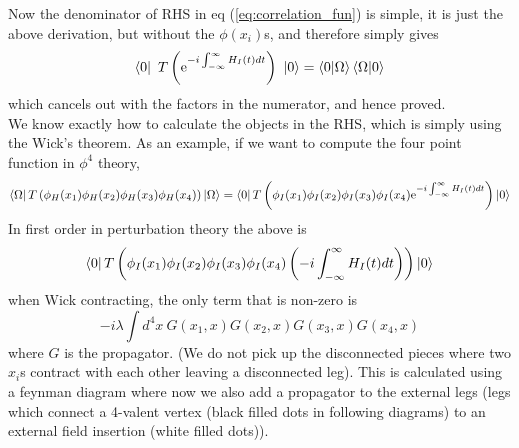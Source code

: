 \documentclass[11pt, notitlepage]{report}
\newcommand{\e}{\mathrm{e}}
\numberwithin{equation}{section}
\begin{document}
Now the denominator of RHS in eq (\ref{eq:correlation_fun}) is simple, it is just the above derivation, but without the \(\phi(x_i)\)s, and therefore simply gives 
\begin{equation*}
    \bra{0}~T\left( \e^{-i\int_{-\infty}^{\infty}H_I(t)dt}\right)~\ket{0} = \braket{0|\Omega}\braket{\Omega|0}
\end{equation*}
which cancels out with the factors in the numerator, and hence proved.\\

We know exactly how to calculate the objects in the RHS, which is simply using the Wick's theorem. As an example, if we want to compute the four point function in \(\phi^4\) theory,
\begin{equation*}
    \bra{\Omega} T\left( \phi_H(x_1)\phi_H(x_2)\phi_H(x_3)\phi_H(x_4) \right)\ket{\Omega} = \bra{0}T\left( \phi_I(x_1)\phi_I(x_2)\phi_I(x_3)\phi_I(x_4) \e^{-i\int_{-\infty}^{\infty}H_I(t) dt } \right) \ket{0}
\end{equation*}
In first order in perturbation theory the above is 
\begin{equation*}
    \bra{0}T\left( \phi_I(x_1)\phi_I(x_2)\phi_I(x_3)\phi_I(x_4) \left(-i\int_{-\infty}^{\infty}H_I(t) dt \right) \right) \ket{0}
\end{equation*}
when Wick contracting, the only term that is non-zero is 
\begin{equation*}
    -i\lambda\int d^4x~ G(x_1, x)G(x_2, x)G(x_3, x)G(x_4, x)
\end{equation*}
where \(G\) is the propagator. (We do not pick up the disconnected pieces where two \(x_i\)s contract with each other leaving a disconnected leg). This is calculated using a feynman diagram where now we also add a propagator to the external legs (legs which connect a 4-valent vertex (black filled dots in following diagrams) to an external field insertion (white filled dots)).

\begin{figure}[h]
    \centering 
\end{figure}
\end{document}
